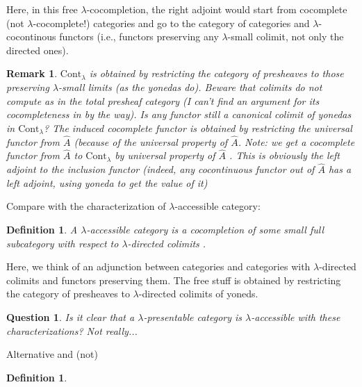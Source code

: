 \documentclass{article}
\newcommand{\CC}{\mathsf{C}}
\newcommand{\Cont}[1]{\text{Cont}_{#1}}
\newcommand{\Set}{\text{Set}}
\newtheorem{definition}[theorem]{Definition}
\newtheorem{question}[theorem]{Question}
\newtheorem{remark}[theorem]{Remark}
\begin{document}
  Here, in this free $\lambda$-cocompletion, the right adjoint would start
  from 
  cocomplete (not $\lambda$-cocomplete!) categories and go to the category of
  categories and $\lambda$-cocontinous functors (i.e., functors preserving any
  $\lambda$-small colimit, not only the directed ones).
  \begin{remark}
	  $\Cont\lambda$ is 
	  obtained by restricting the category of presheaves to those preserving $\lambda$-small limits (as the yonedas do). Beware that colimits do not compute as in the total presheaf category (I can't find an argument for its cocompleteness in \cite{adamek_rosicky} by the way).
	  Is any functor still a canonical colimit of yonedas in $\Cont\lambda$?
	  The induced cocomplete functor is obtained by restricting the universal functor from $\hat{A}$ (because of the universal property of $\hat{A}$. Note: we get a cocomplete functor  from 
	  $\hat{A}$ to $\Cont\lambda$ by universal property of $\hat{A}$ .
	  This is obviously the left adjoint to the inclusion functor
	  (indeed, any cocontinuous functor out of $\hat{A}$ has a left adjoint, using yoneda to get the value of it)
  \end{remark}

  Compare with the characterization of $\lambda$-accessible category:
  \begin{definition}
  A $\lambda$-accessible category is a cocompletion of some small full subcategory with respect to $\lambda$-directed colimits
  \cite[Representation theorem 2.26]{adamek_rosicky}. 
  \end{definition}
  Here, we think of an
  adjunction between categories and categories with $\lambda$-directed colimits
  and functors preserving them.
  The free stuff is obtained by restricting the category of presheaves to $\lambda$-directed colimits of yoneds.
  \begin{question}
   Is it clear that a $\lambda$-presentable category is $\lambda$-accessible
   with these characterizations? Not really...
  \end{question}
  Alternative and (not)
  \begin{definition}
    
  \end{definition}
\end{document}

